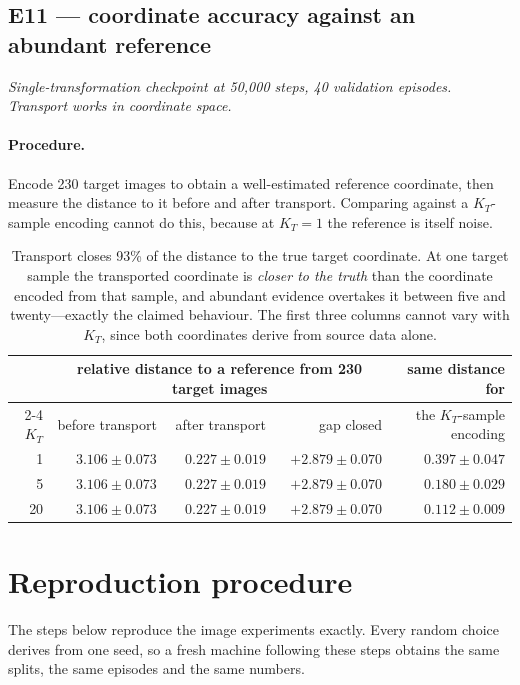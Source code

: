 \documentclass[11pt]{article}
\newcommand{\KT}{K_{T}}
\begin{document}
\subsection{E11 --- coordinate accuracy against an abundant reference}

\textit{Single-transformation checkpoint at 50{,}000 steps, 40 validation episodes. Transport works
in coordinate space.}

\paragraph{Procedure.} Encode 230 target images to obtain a well-estimated reference coordinate,
then measure the distance to it before and after transport. Comparing against a $\KT$-sample
encoding cannot do this, because at $\KT=1$ the reference is itself noise.

\begin{table}[htbp]
\centering\small
\begin{tabular}{@{}rrrrr@{}}
\toprule
& \multicolumn{3}{c}{relative distance to a reference from 230 target images} & same distance for \\
\cmidrule(lr){2-4}
$\KT$ & before transport & after transport & gap closed & the $\KT$-sample encoding \\
\midrule
 1 & $3.106\pm0.073$ & $0.227\pm0.019$ & $+2.879\pm0.070$ & $0.397\pm0.047$ \\
 5 & $3.106\pm0.073$ & $0.227\pm0.019$ & $+2.879\pm0.070$ & $0.180\pm0.029$ \\
20 & $3.106\pm0.073$ & $0.227\pm0.019$ & $+2.879\pm0.070$ & $0.112\pm0.009$ \\
\bottomrule
\end{tabular}
\caption{Transport closes 93\% of the distance to the true target coordinate. At one target sample
the transported coordinate is \emph{closer to the truth} than the coordinate encoded from that
sample, and abundant evidence overtakes it between five and twenty---exactly the claimed behaviour.
The first three columns cannot vary with $\KT$, since both coordinates derive from source data
alone.}
\end{table}

\section{Reproduction procedure}
\label{sec:repro}

The steps below reproduce the image experiments exactly. Every random choice derives from one seed,
so a fresh machine following these steps obtains the same splits, the same episodes and the same
numbers.
\end{document}
